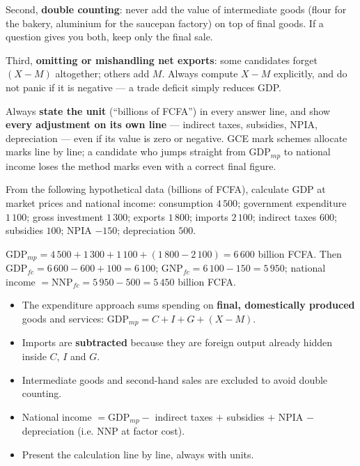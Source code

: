 \documentclass[11pt]{article}
\begin{document}
Second, \textbf{double counting}: never add the value of intermediate goods (flour for the bakery, aluminium for the saucepan factory) on top of final goods. If a question gives you both, keep only the final sale.

Third, \textbf{omitting or mishandling net exports}: some candidates forget $(X-M)$ altogether; others add $M$. Always compute $X - M$ explicitly, and do not panic if it is negative — a trade deficit simply reduces GDP.

\begin{attention}
Always \textbf{state the unit} (``billions of FCFA'') in every answer line, and show \textbf{every adjustment on its own line} — indirect taxes, subsidies, NPIA, depreciation — even if its value is zero or negative. GCE mark schemes allocate marks line by line; a candidate who jumps straight from $\text{GDP}_{mp}$ to national income loses the method marks even with a correct final figure.
\end{attention}

\begin{exercice}
From the following hypothetical data (billions of FCFA), calculate GDP at market prices and national income: consumption $4\,500$; government expenditure $1\,100$; gross investment $1\,300$; exports $1\,800$; imports $2\,100$; indirect taxes $600$; subsidies $100$; NPIA $-150$; depreciation $500$.
\end{exercice}

\begin{corrige}
$\text{GDP}_{mp} = 4\,500 + 1\,300 + 1\,100 + (1\,800 - 2\,100) = 6\,600$ billion FCFA. Then $\text{GDP}_{fc} = 6\,600 - 600 + 100 = 6\,100$; $\text{GNP}_{fc} = 6\,100 - 150 = 5\,950$; national income $= \text{NNP}_{fc} = 5\,950 - 500 = 5\,450$ billion FCFA.
\end{corrige}

\begin{aretenir}
\begin{itemize}
\item The expenditure approach sums spending on \textbf{final, domestically produced} goods and services: $\text{GDP}_{mp} = C + I + G + (X - M)$.
\item Imports are \textbf{subtracted} because they are foreign output already hidden inside $C$, $I$ and $G$.
\item Intermediate goods and second-hand sales are excluded to avoid double counting.
\item National income $= \text{GDP}_{mp} -$ indirect taxes $+$ subsidies $+$ NPIA $-$ depreciation (i.e. NNP at factor cost).
\item Present the calculation line by line, always with units.
\end{itemize}
\end{aretenir}
\end{document}
